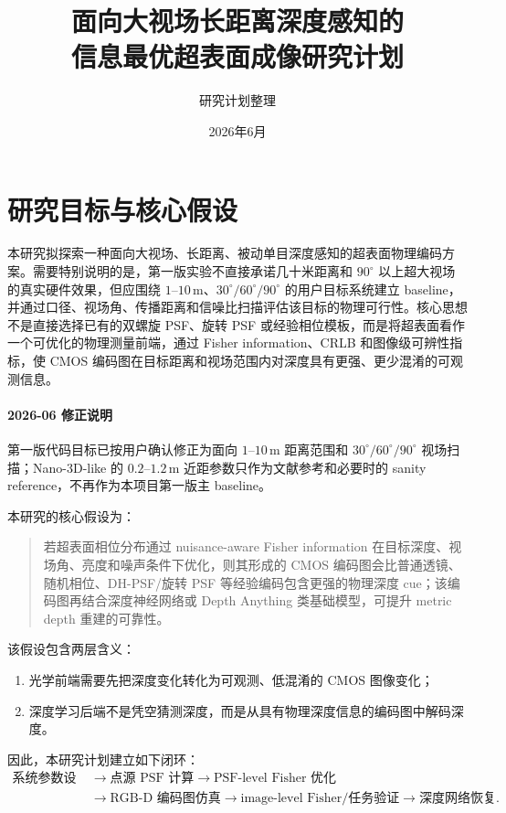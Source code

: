 \documentclass[11pt,a4paper,fontset=none]{ctexart}
\title{\bfseries 面向大视场长距离深度感知的\\信息最优超表面成像研究计划}
\author{研究计划整理}
\date{2026年6月}
\begin{document}
\maketitle
\tableofcontents
\newpage

\section{研究目标与核心假设}

本研究拟探索一种面向大视场、长距离、被动单目深度感知的超表面物理编码方案。需要特别说明的是，第一版实验不直接承诺几十米距离和 $90^\circ$ 以上超大视场的真实硬件效果，但应围绕 $1$--$10\,\mathrm{m}$、$30^\circ/60^\circ/90^\circ$ 的用户目标系统建立 baseline，并通过口径、视场角、传播距离和信噪比扫描评估该目标的物理可行性。核心思想不是直接选择已有的双螺旋 PSF、旋转 PSF 或经验相位模板，而是将超表面看作一个可优化的物理测量前端，通过 Fisher information、CRLB 和图像级可辨性指标，使 CMOS 编码图在目标距离和视场范围内对深度具有更强、更少混淆的可观测信息。

\paragraph{2026-06 修正说明}
第一版代码目标已按用户确认修正为面向 $1$--$10\,\mathrm{m}$ 距离范围和 $30^\circ/60^\circ/90^\circ$ 视场扫描；Nano-3D-like 的 $0.2$--$1.2\,\mathrm{m}$ 近距参数只作为文献参考和必要时的 sanity reference，不再作为本项目第一版主 baseline。

本研究的核心假设为：
\begin{quote}
若超表面相位分布通过 nuisance-aware Fisher information 在目标深度、视场角、亮度和噪声条件下优化，则其形成的 CMOS 编码图会比普通透镜、随机相位、DH-PSF/旋转 PSF 等经验编码包含更强的物理深度 cue；该编码图再结合深度神经网络或 Depth Anything 类基础模型，可提升 metric depth 重建的可靠性。
\end{quote}

该假设包含两层含义：
\begin{enumerate}
  \item 光学前端需要先把深度变化转化为可观测、低混淆的 CMOS 图像变化；
  \item 深度学习后端不是凭空猜测深度，而是从具有物理深度信息的编码图中解码深度。
\end{enumerate}

因此，本研究计划建立如下闭环：
\begin{equation}
\begin{aligned}
  \text{系统参数设定}
  &\rightarrow
  \text{点源 PSF 计算}
  \rightarrow
  \text{PSF-level Fisher 优化}\\
  &\rightarrow
  \text{RGB-D 编码图仿真}
  \rightarrow
  \text{image-level Fisher/任务验证}
  \rightarrow
  \text{深度网络恢复}.
\end{aligned}
\end{equation}
\end{document}
